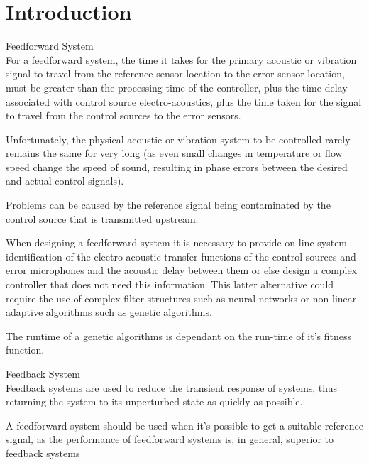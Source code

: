 \chapter{Introduction}
\label{chap:introduction}



\large{Feedforward System}\\
For a feedforward system, the time it takes for the primary acoustic or vibration signal to travel from the reference sensor location to the error sensor location, must be greater than the processing time of the controller, plus the time delay associated with control source electro-acoustics, plus the time taken for the signal to travel from the control sources to the error sensors.\cite{Fuller1995}

Unfortunately, the physical acoustic or vibration system to
be controlled rarely remains the same for very long (as even small changes in temperature or
flow speed change the speed of sound, resulting in phase errors between the desired and
actual control signals).\cite{Fuller1995}

Problems can be caused by the reference signal being contaminated by the control source that is transmitted upstream.\cite{Fuller1995}

When designing a feedforward system it is necessary to provide on-line system identification of the electro-acoustic transfer functions of the control sources and error microphones and the acoustic delay between them or else design a complex controller that does not need this information. This latter alternative could require the use of complex filter structures such as neural networks or non-linear adaptive algorithms such as genetic algorithms.\cite{Fuller1995}

The runtime of a genetic algorithms is dependant on the run-time of it's fitness function.\cite{https://www.youtube.com/watch?v=uQj5UNhCPuo}

\large{Feedback System}\\
Feedback systems are used to reduce the transient response of systems, thus returning the system to its unperturbed state as quickly as possible.\cite{Fuller1995}


A feedforward system should be used when it's possible to get a suitable reference signal, as the performance of feedforward systems is, in general, superior to feedback systems \cite{Fuller1995}